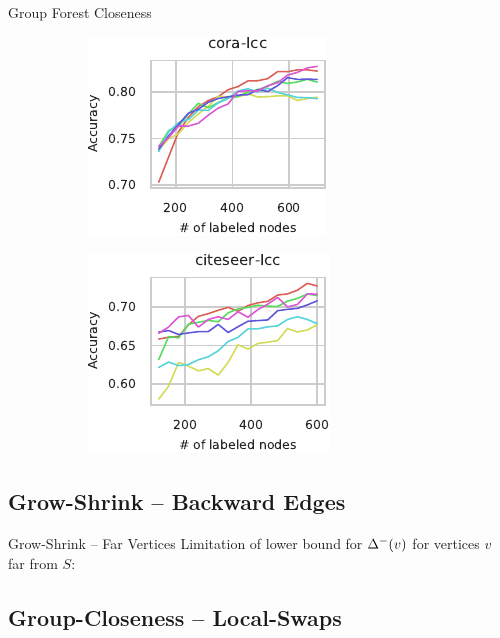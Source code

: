 \documentclass[10pt,titlepage,english,presentation]{beamer}
\begin{document}
\begin{frame}[t]{Group Forest Closeness}
\begin{figure}
\begin{subfigure}[t]{.5\textwidth}
\centering
\includegraphics[width=.6\textwidth]{../sources/plots/el-clos/node-class-cora_lcc.pdf}
\end{subfigure}\hfill
\begin{subfigure}[t]{.5\textwidth}
\centering
\includegraphics[width=.6\textwidth]{../sources/plots/el-clos/node-class-citeseer_lcc.pdf}
\end{subfigure}
\end{figure}
\end{frame}

\subsection{Grow-Shrink -- Backward Edges}
\begin{frame}{Grow-Shrink -- Far Vertices}
\small
Limitation of lower bound for $\Delta^-(v)$ for vertices $v$ far from $S$:

\begin{figure}[H]

\end{figure}
\end{frame}

\subsection{Group-Closeness -- Local-Swaps}
\end{document}
